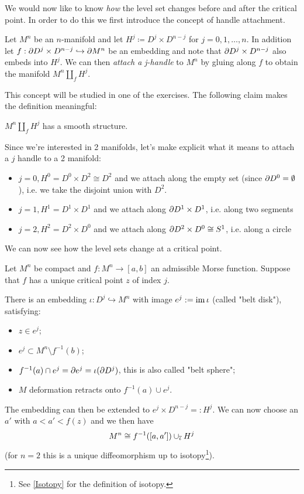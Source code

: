 We would now like to know \textit{how} the level set changes before and after the critical point. In order to do this we first introduce the concept of handle attachment.
\begin{defn}
    Let $M^n$ be an $n$-manifold and let $H^j \coloneqq D^j \times D^{n-j}$ for $j=0,1,\dots, n$. In addition let $f: \partial D^j \times D^{n-j} \hookrightarrow \partial M^n$ be an embedding and note that $\partial D^j \times D^{n-j}$ also embeds into $H^j$. We can then \textit{attach a j-handle} to $M^n$ by gluing along $f$ to obtain the manifold 
    $M^n \amalg_f H^j$.
\end{defn}
\noindent This concept will be studied in one of the exercises. The following claim makes the definition meaningful:
\begin{clm}
    $M^n \amalg_f H^j$ has a smooth structure.
\end{clm}
\noindent Since we're interested in 2 manifolds, let's make explicit what it means to attach a $j$ handle to a 2 manifold:
\begin{itemize}%
    \item $j=0, H^0 = D^0 \times D^2\cong D^2$ and we attach along the empty set (since $\partial D^0 = \emptyset$), i.e. we take the disjoint union with $D^2$.
    \item $j=1, H^1 = D^1 \times D^1$ and we attach along $\partial D^1 \times D^1$, i.e. along two segments
    \item $j=2, H^2 = D^2 \times D^0$ and we attach along $\partial D^2 \times D^0\cong S^1$, i.e. along a circle
\end{itemize}
\noindent We can now see how the level sets change at a critical point.
\begin{thm}
\label{thm:handle_attachment_morse}
    Let $M^n$ be compact and $f: M^n \to [a,b]$ an admissible Morse function. Suppose that $f$ has a unique critical point $z$ of index $j$.

    \noindent There is an embedding $\iota: D^j \hookrightarrow M^n$ with image $e^j :=  \operatorname{im} \iota$ (called "belt disk"), satisfying: 
    \begin{itemize}
        \item $z \in e^j$;
        \item $e^j \subset M^n \setminus f^{-1}(b)$;
        \item $f^{-1}(a) \cap e^j = \partial e^j = \iota (\partial D^j)$, this is also called "belt sphere";
        \item $M$ deformation retracts onto $f^{-1}(a) \cup e^j$.
    \end{itemize}
    The embedding can then be extended to $e^j \times D^{n-j}=: H^j$.
    We can now choose an $a'$ with $a<a'< f(z)$ and we then have
    \begin{equation}
        M^n \cong f^{-1}([a,a']) \cup_{\overline{\iota}} H^j
    \end{equation}
    (for $n=2$ this is a unique diffeomorphism up to isotopy\footnote{See \ref{Isotopy} for the definition of isotopy.}).
\end{thm}

